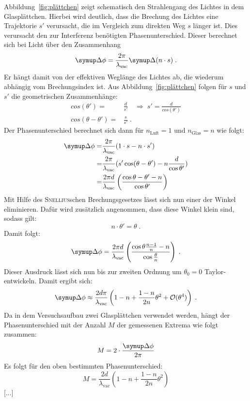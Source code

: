 Abbildung~\ref{fig:plättchen} zeigt schematisch den Strahlengang des Lichtes in dem
Glasplättchen. Hierbei wird deutlich, dass die Brechung des Lichtes eine Trajektorie
$s'$ verursacht, die im Vergleich zum direkten Weg $s$ länger ist. Dies verursacht den
zur Interferenz benötigten Phasenunterschied. Dieser berechnet sich bei Licht über den
Zusammenhang
%
\begin{equation}
  \upD\phi=\frac{2\pi}{\lambda_\text{vac}}\upD(n\cdot s)\; .
\end{equation}
%
Er hängt damit von der effektiven Weglänge des Lichtes ab, die wiederum abhängig vom
Brechungsindex ist. Aus Abbildung~\ref{fig:plättchen} folgen für $s$ und $s'$ die
geometrischen Zusammenhänge:
%
\begin{align}
  cos(\theta')=&\frac{d}{s'}\quad\Rightarrow\;s'=\frac{d}{cos(\theta')}\\
  cos(\theta-\theta')=&\frac{s}{s'}\; .
\end{align}
%
Der Phasenunterschied berechnet sich dann für $n_\text{Luft}=1$ und $n_\text{Glas}=n$
wie folgt:
%
\begin{align*}
  \upD\phi=&\frac{2\pi}{\lambda_\text{vac}}(1\cdot s-n\cdot s') \\
  =&\frac{2\pi}{\lambda_\text{vac}}(s'\cos(\theta-\theta')-n\frac{d}{\cos{\theta'}}) \\
  =&\frac{2\pi d}{\lambda_\text{vac}}\left(\frac{\cos{\theta-\theta'}-n}{\cos{\theta'}}\right)
\end{align*}
%
Mit Hilfe des \textsc{Snellius}schen Brechungsgesetzes lässt sich nun einer der Winkel
eliminieren. Dafür wird zusätzlich angenommen, dass diese Winkel klein sind, sodass
gilt:
%
\begin{equation}
  n\cdot\theta'=\theta \; .
\end{equation}
%
Damit folgt:
%
\begin{equation}
  \upD\phi=\frac{2\pi d}{\lambda_\text{vac}}\left(\frac{\cos{\theta\frac{n-1}{n}}-n}{\cos{\frac{\theta}{n}}}\right) \; .
\end{equation}
%
Dieser Ausdruck lässt sich nun bis zur zweiten Ordnung um $\theta_0=0$
Taylor-entwickeln. Damit ergibt sich:
%
\begin{equation}
  \upD\phi\approx\frac{2d\pi}{\lambda_\text{vac}}\left(1-n+\frac{1-n}{2n}\theta^2+\mathcal{O}(\theta^4)\right) \; .
\end{equation}
%
Da in dem Versuchsaufbau zwei Glasplättchen verwendet werden, hängt der
Phasenunterschied mit der Anzahl $M$ der gemessenen Extrema wie folgt zusammen:
%
\begin{equation}
  M=2\cdot\frac{\upD\phi}{2\pi}
\end{equation}
%
Es folgt für den oben bestimmten Phasenunterschied:
%
\begin{equation}
  M=\frac{2 d}{\lambda_\text{vac}}(1-n+\frac{1-n}{2n}\theta^2)
\end{equation}
%
{\Large [...]}

